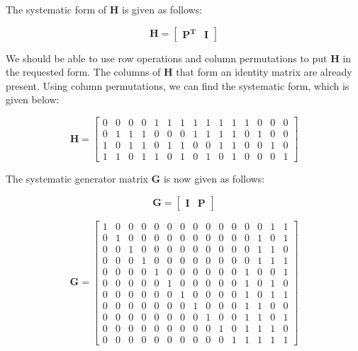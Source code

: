 \documentclass[fleqn]{article}
\begin{document}
\begin{enumerate}
\begin{enumerate}
			The systematic form of $\mathbf{H}$ is given as follows:
			
			\begin{equation*}
				\mathbf{H} = \left[\begin{array}{c|c}
					\mathbf{P^T} & \mathbf{I}
				\end{array}\right]
			\end{equation*}
			
			We should be able to use row operations and column permutations to put $\mathbf{H}$ in the requested form. The columns of $\mathbf{H}$ that form an identity matrix are already present. Using column permutations, we can find the systematic form, which is given below:
			
			\begin{equation*}
				\mathbf{H} = \begin{bmatrix}
					0 & 0 & 0 & 0 & 1 & 1 & 1 & 1 & 1 & 1 & 1 & 1 & 0 & 0 & 0 \\
					0 & 1 & 1 & 1 & 0 & 0 & 0 & 1 & 1 & 1 & 1 & 0 & 1 & 0 & 0 \\
					1 & 0 & 1 & 1 & 0 & 1 & 1 & 0 & 0 & 1 & 1 & 0 & 0 & 1 & 0 \\
					1 & 1 & 0 & 1 & 1 & 0 & 1 & 0 & 1 & 0 & 1 & 0 & 0 & 0 & 1
				\end{bmatrix}
			\end{equation*}
		
			The systematic generator matrix $\mathbf{G}$ is now given as follows:
			
			\begin{equation*}
				\mathbf{G} = \left[\begin{array}{c|c}
					\mathbf{I} & \mathbf{P}
				\end{array}\right]
			\end{equation*}
			
			\begin{equation*}
				\mathbf{G} = \begin{bmatrix}
					1 & 0 & 0 & 0 & 0 & 0 & 0 & 0 & 0 & 0 & 0 & 0 & 0 & 1 & 1\\
					0 & 1 & 0 & 0 & 0 & 0 & 0 & 0 & 0 & 0 & 0 & 0 & 1 & 0 & 1\\
					0 & 0 & 1 & 0 & 0 & 0 & 0 & 0 & 0 & 0 & 0 & 0 & 1 & 1 & 0\\
					0 & 0 & 0 & 1 & 0 & 0 & 0 & 0 & 0 & 0 & 0 & 0 & 1 & 1 & 1\\
					0 & 0 & 0 & 0 & 1 & 0 & 0 & 0 & 0 & 0 & 0 & 1 & 0 & 0 & 1\\
					0 & 0 & 0 & 0 & 0 & 1 & 0 & 0 & 0 & 0 & 0 & 1 & 0 & 1 & 0\\
					0 & 0 & 0 & 0 & 0 & 0 & 1 & 0 & 0 & 0 & 0 & 1 & 0 & 1 & 1\\
					0 & 0 & 0 & 0 & 0 & 0 & 0 & 1 & 0 & 0 & 0 & 1 & 1 & 0 & 0\\
					0 & 0 & 0 & 0 & 0 & 0 & 0 & 0 & 1 & 0 & 0 & 1 & 1 & 0 & 1\\
					0 & 0 & 0 & 0 & 0 & 0 & 0 & 0 & 0 & 1 & 0 & 1 & 1 & 1 & 0\\
					0 & 0 & 0 & 0 & 0 & 0 & 0 & 0 & 0 & 0 & 1 & 1 & 1 & 1 & 1
				\end{bmatrix}
			\end{equation*}
			

\end{enumerate}
\end{enumerate}
\end{document}
